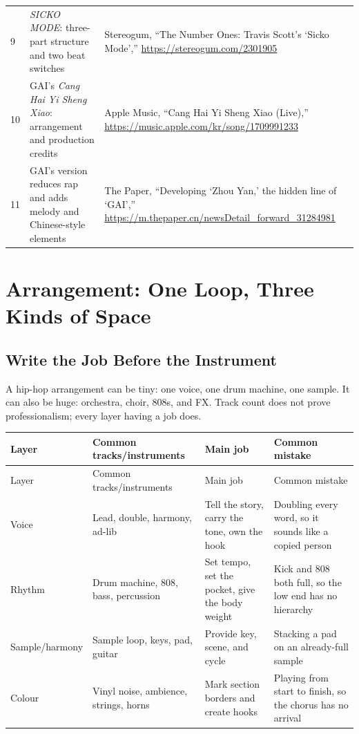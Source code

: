 \begin{longtable}{p{}p{}p{}}
9 & \emph{SICKO MODE}: three-part structure and two beat switches & Stereogum, ``The Number Ones: Travis Scott's `Sicko Mode','' \url{https://stereogum.com/2301905} \\
10 & GAI's \emph{Cang Hai Yi Sheng Xiao}: arrangement and production credits & Apple Music, ``Cang Hai Yi Sheng Xiao (Live),'' \url{https://music.apple.com/kr/song/1709991233} \\
11 & GAI's version reduces rap and adds melody and Chinese-style elements & The Paper, ``Developing `Zhou Yan,' the hidden line of `GAI','' \url{https://m.thepaper.cn/newsDetail_forward_31284981} \\
\bottomrule
\end{longtable}

\section{Arrangement: One Loop, Three Kinds of Space}
\label{sec:hiphop-craft}

\subsection{Write the Job Before the Instrument}
\label{sec:hiphop-instrumentation}

A hip-hop arrangement can be tiny: one voice, one drum machine, one sample. It can also be huge: orchestra, choir, 808s, and FX. Track count does not prove professionalism; every layer having a job does.

\begin{longtable}{p{}p{}p{}p{}}
\toprule
Layer & Common tracks/instruments & Main job & Common mistake \\
\midrule
\endfirsthead
\toprule
Layer & Common tracks/instruments & Main job & Common mistake \\
\midrule
\endhead
Voice & Lead, double, harmony, ad-lib & Tell the story, carry the tone, own the hook & Doubling every word, so it sounds like a copied person \\
Rhythm & Drum machine, 808, bass, percussion & Set tempo, set the pocket, give the body weight & Kick and 808 both full, so the low end has no hierarchy \\
Sample/harmony & Sample loop, keys, pad, guitar & Provide key, scene, and cycle & Stacking a pad on an already-full sample \\
Colour & Vinyl noise, ambience, strings, horns & Mark section borders and create hooks & Playing from start to finish, so the chorus has no arrival \\
\bottomrule
\end{longtable}

